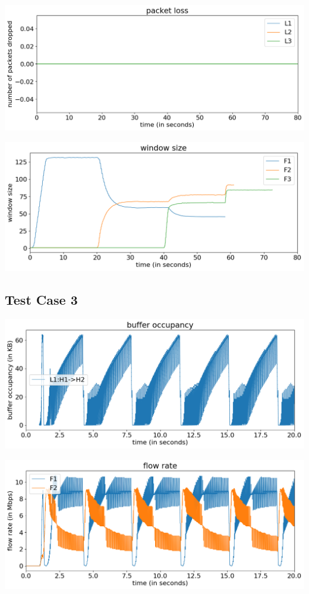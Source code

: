 \documentclass{article}
\begin{document}
\includegraphics[width = \textwidth]{"test_case2_fast packet loss"}

\includegraphics[width = \textwidth]{"test_case2_fast window size"}


\subsection{Test Case 3} 

\includegraphics[width = \textwidth]{"test_case3 buffer occupancy"}

\includegraphics[width = \textwidth]{"test_case3 flow rate"}
\end{document}

